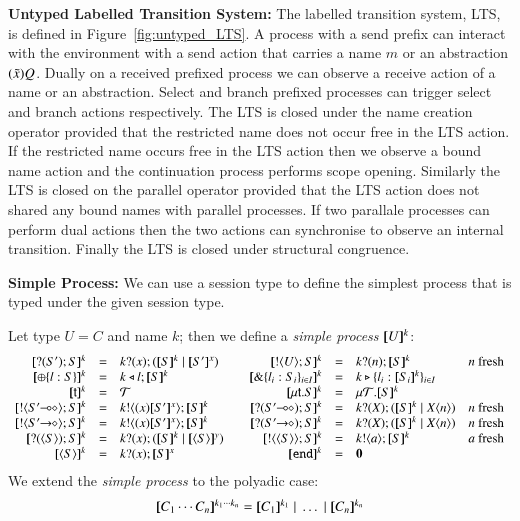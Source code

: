 

{\bf Untyped Labelled Transition System:}
The labelled transition system, LTS, is defined in Figure~\ref{fig:untyped_LTS}.
A process with a send prefix can interact with the environment with a send
action that carries a name $m$ or an abstraction $(\tilde{x})Q$. Dually
on a received prefixed process we can observe a receive action of a name or
an abstraction. Select and branch prefixed processes can trigger select
and branch actions respectively. The LTS is closed under the name creation
operator provided that the restricted name does not occur free in the LTS action.
If the restricted name occurs free in the LTS action then we observe a bound name
action and the continuation process performs scope opening. Similarly the LTS 
is closed on the parallel operator provided that the LTS action does not shared
any bound names with parallel processes. If two parallale processes can perform
dual actions then the two actions can synchronise to observe an internal transition.
Finally the LTS is closed under structural congruence.

{\bf Simple Process: }
We can use a session type to define the simplest process that is typed
under the given session type.
%
\begin{definition}\rm
	Let type $U = C$ and name $k$; then we define a {\em simple process}
	$[\!\![U]\!\!]^{k}$:
	\[
	\begin{array}{rclcrcll}
		\map{\btinp{S'} S}^{k} &=& \binp{k}{x} (\map{S}^{k} \Par \map{S'}^{x})
		&&
		\map{\btout{U} S}^{k} &=& \binp{k}{n} \map{S}^{k} & n\textrm{ fresh}
		\\

		\map{\btsel{l : S}}^{k} &=& \bsel{k}{l} \map{S}^{k}
		& &
		\map{\btbra{l_i: S_i}_{i \in I}}^{k} &=& \bbra{k}{l_i: \map{S_i}^{k}}_{i \in I}
		\\

		\map{\tvar{t}}^{k} &=& \rvar{T}
		& &
		\map{\trec{t}{S}}^{k} &=& \recp{T}{\map{S}^{k}}
		\\

		\map{\btout{\lhot{S'}} S}^{k} &=& \bout{k}{\abs{x}{\map{S'}^x}} \map{S}^k
		& &
		\map{\btinp{\lhot{S'}} S}^{k} &=& \binp{k}{X} (\map{S}^k \Par \appl{X}{n}) & n\textrm{ fresh}
		\\

		\map{\btout{\shot{S'}} S}^{k} &=& \bout{k}{\abs{x}{\map{S'}^x}} \map{S}^k
		& &
		\map{\btinp{\shot{S'}} S}^{k} &=& \binp{k}{X} (\map{S}^k \Par \appl{X}{n}) & n\textrm{ fresh}
		\\

		\map{\btinp{\chtype{S}} S}^{k} &=& \binp{k}{x} (\map{S}^k \Par \map{\chtype{S}}^y)
		&&
		\map{\btout{\chtype{S}} S}^{k} &=& \bout{k}{a} \map{S}^k  & a\textrm{ fresh}
		\\
		\map{\chtype{S}}^{k} &=& \binp{k}{x} \map{S}^x 
		&&
		\map{\tinact}^{k} &=& \inact
	\end{array}
	\]
	We extend the {\em simple process} to the polyadic case:
\[
	\begin{array}{c}
		\map{C_1 \cdots C_n}^{k_1 \cdots k_n} = \map{C_1}^{k_1} \Par \dots \Par \map{C_n}^{k_n}
	\end{array}
\]
\end{definition}

